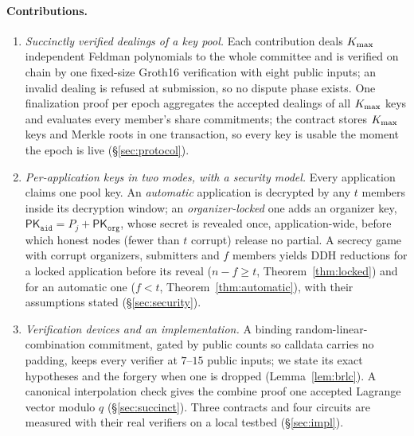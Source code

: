 \paragraph{Contributions.}
\begin{enumerate}[leftmargin=1.5em,nosep]
  \item \emph{Succinctly verified dealings of a key pool.} Each contribution deals $K_{\max}$ independent Feldman polynomials to the whole committee and is verified on chain by one fixed-size Groth16 verification with eight public inputs; an invalid dealing is refused at submission, so no dispute phase exists. One finalization proof per epoch aggregates the accepted dealings of all $K_{\max}$ keys and evaluates every member's share commitments; the contract stores $K_{\max}$ keys and Merkle roots in one transaction, so every key is usable the moment the epoch is live (\S\ref{sec:protocol}).
  \item \emph{Per-application keys in two modes, with a security model.} Every application claims one pool key. An \emph{automatic} application is decrypted by any $t$ members inside its decryption window; an \emph{organizer-locked} one adds an organizer key, $\mathsf{PK}_{\mathtt{aid}} = P_j + \mathsf{PK}_{\mathtt{org}}$, whose secret is revealed once, application-wide, before which honest nodes (fewer than $t$ corrupt) release no partial. A secrecy game with corrupt organizers, submitters and $f$ members yields DDH reductions for a locked application before its reveal ($n - f \ge t$, Theorem~\ref{thm:locked}) and for an automatic one ($f < t$, Theorem~\ref{thm:automatic}), with their assumptions stated (\S\ref{sec:security}).
  \item \emph{Verification devices and an implementation.} A binding random-linear-combination commitment, gated by public counts so calldata carries no padding, keeps every verifier at $7$--$15$ public inputs; we state its exact hypotheses and the forgery when one is dropped (Lemma~\ref{lem:brlc}). A canonical interpolation check gives the combine proof one accepted Lagrange vector modulo $q$ (\S\ref{sec:succinct}). Three contracts and four circuits are measured with their real verifiers on a local testbed (\S\ref{sec:impl}).
\end{enumerate}

